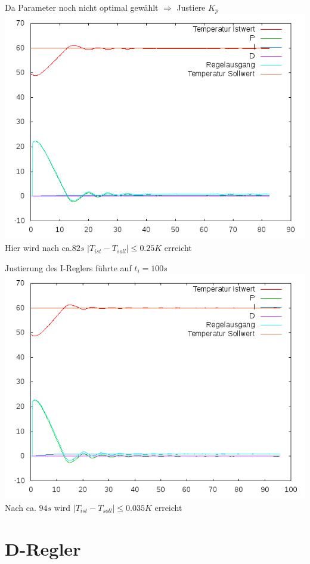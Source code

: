 \documentclass[compress,11pt]{beamer}
\begin{document}
\begin{frame}
Da Parameter noch nicht optimal gewählt $\Rightarrow$ Justiere $K_p$\\
\includegraphics[width=.7\textwidth]{../2aufgabe/2dk2ti200}\\
Hier wird nach ca.$82 s$ $|T_{ist} - T_{soll}| \leq 0.25 K$ erreicht
\end{frame}
\begin{frame}
Justierung des I-Reglers führte auf $t_i = 100 s$\\
\includegraphics[width=.7\textwidth]{../2aufgabe/2dk2ti100}\\
Nach ca. $94 s$ wird $|T_{ist} - T_{soll}| \leq 0.035 K$ erreicht
\end{frame}

\section{D-Regler}
\end{document}
